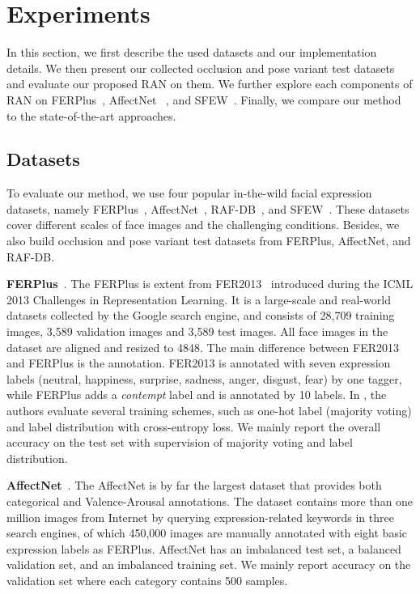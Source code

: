 \documentclass[journal]{IEEEtran}
\newcommand{\kwang}[1]{\textcolor[rgb]{0,0,0}{#1}}
\begin{document}
\section{Experiments}
\label{experiment}
In this section, we first describe the used datasets and our implementation details. We then present our collected occlusion and pose variant test datasets and evaluate our proposed RAN on them. We further explore each components of RAN on FERPlus~\cite{barsoum2016training}, AffectNet~\cite{mollahosseini2017affectnet} , and SFEW~\cite{6130508}. Finally, we compare our method to the state-of-the-art approaches.

\subsection{Datasets}
\kwang{To evaluate our method, we use four popular in-the-wild facial expression datasets, namely FERPlus~\cite{barsoum2016training}, AffectNet~\cite{mollahosseini2017affectnet}, RAF-DB~\cite{8453893}, and SFEW~\cite{6130508}. These datasets cover different scales of face images and the challenging conditions. Besides, we also build occlusion and pose variant test datasets from FERPlus, AffectNet, and RAF-DB.}

\textbf{FERPlus}~\cite{barsoum2016training}. The FERPlus is extent from FER2013~\cite{goodfellow2013challenges} introduced during the ICML 2013 Challenges in Representation Learning. It is a large-scale and real-world datasets collected by the Google search engine, and consists of 28,709 training images, 3,589 validation images and 3,589 test images. All face images in the dataset are aligned and resized to 4848. The main difference between FER2013 and FERPlus is the annotation. FER2013 is annotated with seven expression labels (neutral, happiness, surprise, sadness, anger, disgust, fear) by one tagger, while FERPlus adds a \textit{contempt} label and is annotated by 10 labels. In \cite{barsoum2016training}, the authors evaluate several training schemes, such as one-hot label (majority voting) and  label distribution with cross-entropy loss. We mainly report the overall accuracy on the test set with supervision of majority voting and label distribution.

\textbf{AffectNet}~\cite{mollahosseini2017affectnet}.  The AffectNet is by far the largest dataset that provides both categorical  and Valence-Arousal annotations. The dataset contains more than one million images from Internet by querying expression-related keywords in three search engines, of which 450,000 images are manually annotated with eight basic expression labels as FERPlus. AffectNet has an imbalanced test set, a balanced validation set, and an imbalanced training set. We mainly report accuracy on the validation set where each category contains 500 samples.
\end{document}
